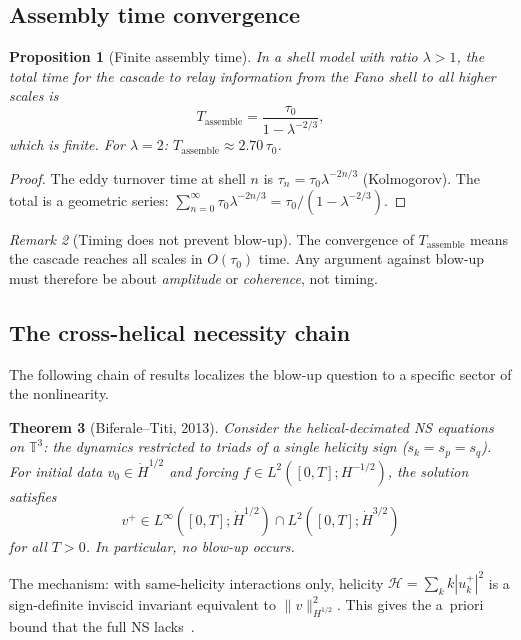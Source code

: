 \documentclass[11pt]{article}
\newtheorem{theorem}{Theorem}
\newtheorem{proposition}[theorem]{Proposition}
\theoremstyle{definition}
\theoremstyle{remark}
\newtheorem{remark}[theorem]{Remark}
\begin{document}
\subsection{Assembly time convergence}

\begin{proposition}[Finite assembly time]\label{prop:assembly}
In a shell model with ratio $\lambda > 1$, the total time for the
cascade to relay information from the Fano shell to all higher scales
is
\[
  T_{\mathrm{assemble}} = \frac{\tau_0}{1 - \lambda^{-2/3}},
\]
which is finite. For $\lambda = 2$:
$T_{\mathrm{assemble}} \approx 2.70\,\tau_0$.
\end{proposition}

\begin{proof}
The eddy turnover time at shell $n$ is $\tau_n = \tau_0\lambda^{-2n/3}$
(Kolmogorov). The total is a geometric series:
$\sum_{n=0}^\infty \tau_0 \lambda^{-2n/3}
= \tau_0/(1 - \lambda^{-2/3})$.
\end{proof}

\begin{remark}[Timing does not prevent blow-up]
The convergence of $T_{\mathrm{assemble}}$ means the cascade
reaches all scales in $O(\tau_0)$ time. Any argument against blow-up
must therefore be about \emph{amplitude} or \emph{coherence}, not
timing.
\end{remark}

\subsection{The cross-helical necessity chain}

The following chain of results localizes the blow-up question to
a specific sector of the nonlinearity.

\begin{theorem}[Biferale--Titi, 2013]\label{thm:BT}
Consider the helical-decimated NS equations on $\mathbb{T}^3$: the
dynamics restricted to triads of a single helicity sign
($s_k = s_p = s_q$). For initial data $v_0 \in \dot{H}^{1/2}$ and
forcing $f \in L^2([0,T]; H^{-1/2})$, the solution satisfies
\[
  v^+ \in L^\infty([0,T]; \dot{H}^{1/2}) \cap L^2([0,T]; \dot{H}^{3/2})
\]
for all $T > 0$. In particular, no blow-up occurs.
\end{theorem}

The mechanism: with same-helicity interactions only, helicity
$\mathcal{H} = \sum_k k |u_k^+|^2$ is a sign-definite inviscid
invariant equivalent to $\|v\|_{H^{1/2}}^2$. This gives the a~priori
bound that the full NS lacks~\cite{BiferaleTiti2013}.
\end{document}
